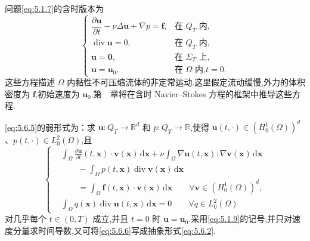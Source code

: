 \begin{example}\label{ex:5.6.2}
问题\eqref{eq:5.1.7}的含时版本为
\begin{equation}\label{eq:5.6.5}
  \begin{cases}
    \dfrac{\partial\boldsymbol{u}}{\partial t}-\nu\Delta\boldsymbol{u}+\nabla p
      =\boldsymbol{f},&\text{在 }Q_T\text{ 内},\\[2pt]
    \operatorname{div}\boldsymbol{u}=0,&\text{在 }Q_T\text{ 内},\\
    \boldsymbol{u}=\boldsymbol{0},&\text{在 }\Sigma_T\text{ 上},\\
    \boldsymbol{u}=\boldsymbol{u}_0,&\text{在 }\Omega\text{ 内,}t=0.
  \end{cases}
\end{equation}
这些方程描述 \(\Omega\) 内黏性不可压缩流体的非定常运动.这里假定流动缓慢,外力的体积密度为 \(\boldsymbol{f}\),初始速度为 \(\boldsymbol{u}_0\).第~~章将在含时 Navier--Stokes 方程的框架中推导这些方程.

\eqref{eq:5.6.5}的弱形式为：求 \(\boldsymbol{u}\colon Q_T\to\mathbb R^d\) 和 \(p\colon Q_T\to\mathbb R\),使得 \(\boldsymbol{u}(t,\cdot)\in(H_0^1(\Omega))^d\)、\(p(t,\cdot)\in L_0^2(\Omega)\),且
\begin{equation}\label{eq:5.6.6}
  \left\{
  \begin{aligned}
    &\int_\Omega \frac{\partial\boldsymbol{u}}{\partial t}(t,\boldsymbol{x})\cdot
           \boldsymbol{v}(\boldsymbol{x})\,\mathrm d\boldsymbol{x}
     +\nu\int_\Omega\nabla\boldsymbol{u}(t,\boldsymbol{x}):\nabla\boldsymbol{v}(\boldsymbol{x})\,\mathrm d\boldsymbol{x}\\
    &\qquad-\int_\Omega p(t,\boldsymbol{x})\operatorname{div}\boldsymbol{v}(\boldsymbol{x})\,\mathrm d\boldsymbol{x}\\
    &\qquad=\int_\Omega\boldsymbol{f}(t,\boldsymbol{x})\cdot\boldsymbol{v}(\boldsymbol{x})\,\mathrm d\boldsymbol{x}
             \qquad\forall\boldsymbol{v}\in(H_0^1(\Omega))^d,\\[3pt]
    &\int_\Omega q(\boldsymbol{x})\operatorname{div}\boldsymbol{u}(t,\boldsymbol{x})\,\mathrm d\boldsymbol{x}=0
             \qquad\forall q\in L_0^2(\Omega)
  \end{aligned}
  \right.
\end{equation}
对几乎每个 \(t\in(0,T)\) 成立,并且 \(t=0\) 时 \(\boldsymbol{u}=\boldsymbol{u}_0\).采用\eqref{eq:5.1.9}的记号,并只对速度分量求时间导数,又可将\eqref{eq:5.6.6}写成抽象形式\eqref{eq:5.6.2}.
\end{example}

